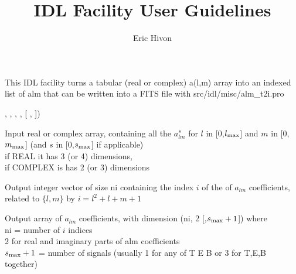

\sloppy

\title{\healpix IDL Facility User Guidelines}
 \section[alm\_t2i]{ }
\label{idl:alm_t2i}
\author{Eric Hivon}

\begin{facility}
{This IDL facility turns a tabular (real or complex) a(l,m) array into an
indexed list of alm that can be written into a FITS file with %
}
{src/idl/misc/alm\_t2i.pro}
\end{facility}

\begin{IDLformat}
{\thedocid, %
,
, 
,
[%
,
%
])}
\end{IDLformat}

\begin{qualifiers}
  \begin{qulist}{} %
    \item[Alm\_table] 
Input real or complex array, containing all the $a^s_{lm}$ for $l$
         in [0,$l_{\rm max}$] and $m$ in [0,$m_{\rm max}$] 
(and $s$ in [0,$s_{\rm max}$] if applicable)\\
       if REAL    it has 3 (or 4) dimensions,\\
       if COMPLEX is has 2 (or 3) dimensions

    \item[Index] 
Output integer vector of size ni containing the index $i$ of the 
            of $a_{lm}$ coefficients, related to $\{l,m\}$ by 
             $i = l^2 + l + m + 1$
    \item[Alm\_vec] %
Output array of $a_{lm}$ coefficients, with dimension (ni, 2 [,$s_{\rm max}+1$])
     where\\
           ni   = number of $i$ indices\\
           2 for real and imaginary parts of alm coefficients\\
           $s_{\rm max}+1$ = number of signals (usually 1 for any of T E B
                  or 3 for T,E,B together)
\end{qulist}
\end{qualifiers}

